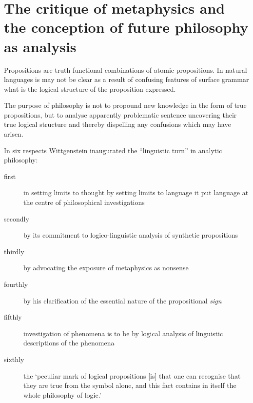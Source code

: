 \section{The critique of metaphysics and the conception of future philosophy as analysis}

Propositions are truth functional combinations of atomic propositions.
In natural languages is may not be clear as a result of confusing features of surface grammar what is the logical structure of the proposition expressed.

The purpose of philosophy is not to propound new knowledge in the form of true propositions, but to analyse apparently problematic sentence uncovering their true logical structure and thereby dispelling any confusions which may have arisen.

In six respects Wittgenstein inaugurated the ``linguistic turn'' in analytic philosophy:

\begin{description}
\item[first] in setting limits to thought by setting limits to language it put language at the centre of philosophical investigations
\item[secondly] by its commitment to logico-linguistic analysis of synthetic propositions
\item[thirdly] by advocating the exposure of metaphysics as nonsense
\item[fourthly] by his clarification of the essential nature of the propositional {\it sign}
\item[fifthly] investigation of phenomena is to be by logical analysis of linguistic descriptions of the phenomena
\item[sixthly] the `peculiar mark of logical propositions [is] that one can recognise that they are true from the symbol alone, and this fact contains in itself the whole philosophy of logic.'
\end{description}

